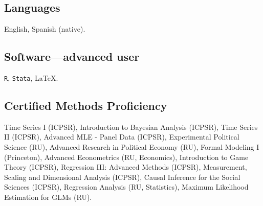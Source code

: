 \subsection*{Languages}
English, Spanish (native).


\subsection*{Software---advanced user}
\texttt{R}, \texttt{Stata}, \LaTeX.

\subsection*{Certified Methods Proficiency}
Time Series I (ICPSR), Introduction to Bayesian Analysis (ICPSR), Time Series II (ICPSR), Advanced MLE - Panel Data (ICPSR), Experimental Political Science (RU), Advanced Research in Political Economy (RU), Formal Modeling I (Princeton), Advanced Econometrics (RU, Economics), Introduction to Game Theory (ICPSR), Regression III: Advanced Methods (ICPSR), Measurement, Scaling and Dimensional Analysis (ICPSR), Causal Inference for the Social Sciences (ICPSR), Regression Analysis (RU, Statistics), Maximum Likelihood Estimation for GLMs (RU).

